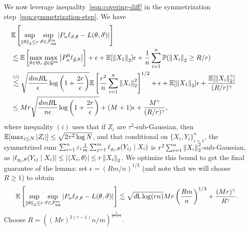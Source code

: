 We now leverage inequality~\eqref{eqn:covering-diff}
in the symmetrization step~\eqref{eqn:symmetrization-step}.
We have
\begin{align*}
	\lefteqn{\E\left[\sup_{\ltwo{\theta} \le r}
		\sup_{\vec{\sigma} \in \Flink^m} |P_n \loss_{\vec{\sigma},\theta} - L(\theta,
		\vec{\sigma})|\right]} \\
	& \lesssim
	\E\left[\max_{\theta \in \Theta_\epsilon}
	\max_{\vec{g} \in \mc{G}^m}
	\left|P_n^0 \loss_{\vec{g}, \theta}\right|
	\right]
	+ \epsilon + \E[\ltwo{X_1}] \epsilon
	+ \frac{1}{n} \sum_{i = 1}^n \P(\ltwo{X_i} \ge R / r) \\
	& \stackrel{(i)}{\lesssim}
	\sqrt{\frac{d m R \lipconst}{\epsilon}
		\log\left(1 + \frac{2r}{\epsilon}\right)}
	\E\left[\frac{r^2}{n}\sum_{i = 1}^n \ltwo{X_i}^2\right]^{1/2}
	+ \epsilon + \E[\ltwo{X_1}] \epsilon
	+ \frac{\E[\ltwo{X_i}^{\gamma}]}{(R/r)^{\gamma}} \\
	& \le
	M r \sqrt{\frac{dm R \lipconst}{n \epsilon}
		\log \left(1 + \frac{2r}{\epsilon}\right)}
	+ (M + 1) \epsilon
	+ \frac{M^{\gamma}}{(R/r)^{\gamma}},
\end{align*}
where inequality $(i)$ uses that if $Z_i$ are $\tau^2$-sub-Gaussian, then
$\mathbb{E}[\max_{i \le N} |Z_i|] \le \sqrt{2 \tau^2 \log N}$, and that
conditional on $\{X_i, Y_i\}_{i = 1}^n$, the symmetrized sum $\sum_{i =
	1}^n \varepsilon_i \frac{1}{m} \sum_{j = 1}^m \ell_{g_j, \theta}(Y_{ij}
\mid X_i)$ is $r^2 \sum_{i = 1}^n \left\|{X_i}\right\|_2^2$-sub-Gaussian, as
$|\ell_{g_j, \theta}(Y_{ij} \mid X_i)| \le |\langle X_i, \theta\rangle| \le r
\left\|{X_i}\right\|_2$.  We optimize this bound to get the final guarantee of the
lemma: set $\epsilon = (Rm / n)^{1/3}$ (and note that we will
choose $R \ge 1$) to obtain
\begin{equation*}
	\mathbb{E}\left[\sup_{\left\|{\theta}\right\|_2 \le r}
	\sup_{\vec{\sigma} \in \mathcal{F}_{\mathsf{link}}^m} |P_n \ell_{\vec{\sigma},\theta} - L(\theta,
	\vec{\sigma})|\right]
	\lesssim \sqrt{d \mathsf{L} \log(rn)}
	M r \left(\frac{R m}{n}\right)^{1/3}
	+ \frac{(Mr)^\gamma}{R^\gamma}.
\end{equation*}
Choose $R
= ((Mr)^{3(\gamma - 1)} n / m)^\frac{1}{3\gamma + 1}$.

